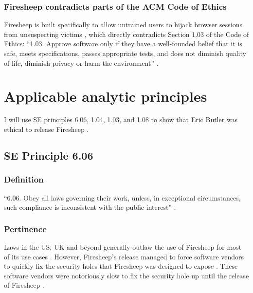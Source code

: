 \documentclass[12pt,twocolumn]{article}
\begin{document}
\subsubsection{Firesheep contradicts parts of the ACM Code of Ethics}
Firesheep is built specifically to allow untrained users to hijack browser sessions from unsuspecting victims \cite{eric-butler}, which directly contradicts Section 1.03 of the Code of Ethics: ``1.03. Approve software only if they have a well-founded belief that it is safe, meets specifications, passes appropriate tests, and does not diminish quality of life, diminish privacy or harm the environment'' \cite{se-code}. 


\section{Applicable analytic principles}
I will use SE principles 6.06, 1.04, 1.03, and 1.08 to show that Eric Butler was ethical to release Firesheep \cite{se-code}.

\subsection{SE Principle 6.06}
\subsubsection{Definition}
``6.06. Obey all laws governing their work, unless, in exceptional circumstances, such compliance is inconsistent with the public interest'' \cite{se-code}.
\subsubsection{Pertinence}
Laws in the US, UK and beyond generally outlaw the use of Firesheep for most of its use cases \cite{illegal-to-use-firesheep} \cite{illegal-to-use-firesheep-uk}. However, Firesheep's release managed to force software vendors to quickly fix the security holes that Firesheep was designed to expose \cite{disconnect-blog}. These software vendors were notoriously slow to fix the security hole up until the release of Firesheep \cite{disconnect-blog}. 
\end{document}
